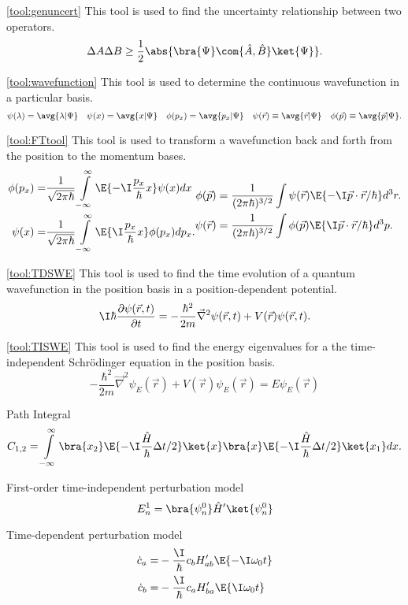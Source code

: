 \ref{tool:genuncert} This tool is used to find the uncertainty relationship between two operators.
\[
\Delta A \Delta B \geq \frac{1}{2} \abs{\bra{\Psi}\com{\hat{A},\hat{B}}\ket{\Psi}}.
\]

\ref{tool:wavefunction} This tool is used to determine the continuous wavefunction in a particular basis.
\[
\psi(\lambda) = \avg{\lambda|\Psi}\quad \psi(x) = \avg{x|\Psi}\quad \phi(p_x) = \avg{p_x|\Psi} \quad \psi(\vec{r}) \equiv \avg{\vec{r}|\Psi} \quad \phi(\vec{p}) \equiv \avg{\vec{p}|\Psi}.
\]

\ref{tool:FTtool} This tool is used to transform a wavefunction back and forth from the position to the momentum bases.
\[
\begin{split}
\phi(p_x)= &  \frac{1}{\sqrt{2\pi\hbar}}\int\displaylimits_{-\infty}^{\infty}\E{-\I \frac{p_x}{\hbar} x} \psi(x) dx\\
\psi(x) = &  \frac{1}{\sqrt{2\pi\hbar}}\int\displaylimits_{-\infty}^{\infty}\E{\I \frac{p_x}{\hbar} x} \phi(p_x) dp_x.
\end{split}
\begin{split}
\displaystyle \phi(\vec{p})& = \frac{1}{(2\pi\hbar)^{3/2}}\int \psi(\vec{r})\E{-\I\vec{p}\cdot \vec{r}/\hbar}d^{3}r.\\
\displaystyle \psi(\vec{r}) &= \frac{1}{(2\pi\hbar)^{3/2}}\int \phi(\vec{p})\E{\I\vec{p}\cdot \vec{r}/\hbar}d^{3}p.
\end{split}
\]


\ref{tool:TDSWE} This tool is used to find the time evolution of a quantum wavefunction in the position basis in a position-dependent potential.
\[
\I\hbar \frac{\partial \psi(\vec{r},t)}{\partial t} =-\frac{\hbar^2}{2m}\vec{\nabla}^2\psi(\vec{r},t) + V(\vec{r}) \psi(\vec{r},t).
\]

\ref{tool:TISWE} This tool is used to find the energy eigenvalues for a the time-independent Schr\"{o}dinger equation in the position basis.
\[
-\frac{\hbar^2}{2m}\vec{\nabla}^2\psi_E(\vec{r}) + V(\vec{r}) \psi_E(\vec{r})= E \psi_E(\vec{r})
\]

Path Integral
\[
C_{1,2} =\int\displaylimits_{-\infty}^{\infty}\bra{x_2} \E{-\I \frac{\hat{H}}{\hbar} \Delta t/2}\ket{x}\bra{x}\E{-\I \frac{\hat{H}}{\hbar} \Delta t/2}\ket{x_1}dx.
\]

First-order time-independent perturbation model
\[
E_n^1 = \bra{\psi_n^0}\hat{H}'\ket{\psi_n^0}
\]

Time-dependent perturbation model
\[
\begin{split}
\dot{c}_a =& -\frac{\I}{\hbar} c_b H'_{ab} \E{-\I\omega_0 t} \\
\dot{c}_b =&  -\frac{\I}{\hbar} c_a H'_{ba} \E{\I\omega_0 t}
\end{split}
\]

